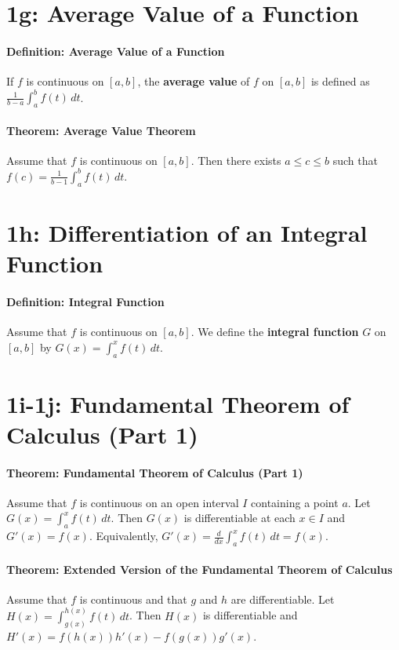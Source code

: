 \documentclass[10pt,letter]{article}
\begin{document}
\section*{1g: Average Value of a Function} 
\paragraph{Definition: Average Value of a Function}
If $f$ is continuous on $[a,b]$, the \textbf{average value} of $f$ on $[a,b]$ is defined as $\frac{1}{b-a}\int_a^bf(t)\,dt$. 
\paragraph{Theorem: Average Value Theorem}
Assume that $f$ is continuous on $[a,b]$. Then there exists $a\leq c\leq b$ such that $f(c)=\frac{1}{b-1}\int_a^bf(t)\,dt$.

\section*{1h: Differentiation of an Integral Function} 
\paragraph{Definition: Integral Function}
Assume that $f$ is continuous on $[a,b]$. We define the \textbf{integral function} $G$ on $[a,b]$ by $G(x)=\int_a^xf(t)\,dt$.  

\section*{1i-1j: Fundamental Theorem of Calculus (Part 1)}
\paragraph{Theorem: Fundamental Theorem of Calculus (Part 1)}
Assume that $f$ is continuous on an open interval $I$ containing a point $a$. Let $G(x)=\int_a^xf(t)\,dt$. Then $G(x)$ is differentiable at each $x\in I$ and $G'(x)=f(x)$. Equivalently, $G'(x)=\frac{d}{dx}\int_a^xf(t)\,dt=f(x)$. 
\paragraph{Theorem: Extended Version of the Fundamental Theorem of Calculus}
Assume that $f$ is continuous and that $g$ and $h$ are differentiable. Let $H(x)=\int_{g(x)}^{h(x)}f(t)\,dt$. Then $H(x)$ is differentiable and $H'(x)=f(h(x))h'(x)-f(g(x))g'(x)$. 
\end{document}

